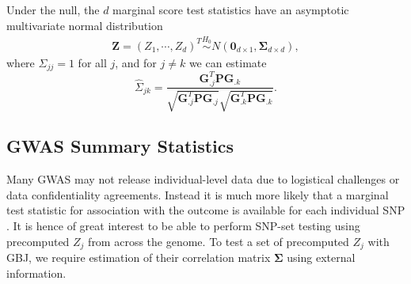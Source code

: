 \documentclass[12pt]{article}
\begin{document}
Under the null, the $d$ marginal score test statistics have an asymptotic multivariate normal distribution
\begin{eqnarray*}
\mathbf{Z}=\left( Z_{1},\cdots, Z_{d} \right)^{T} \overset{H_{0}}{\sim} N(\mathbf{0}_{d\times1},\boldsymbol{\Sigma}_{d\times d}),
\label{p2_eq:Z_dist}
\end{eqnarray*}
where $\Sigma_{jj}=1$ for all $j$, and for $j\neq k$ we can estimate
\begin{equation}
\widehat\Sigma_{jk}=\frac{\mathbf{G}_{.j}^{T}\mathbf{P}\mathbf{G}_{.k}}{\sqrt{\mathbf{G}_{.j}^{T}\mathbf{P}\mathbf{G}_{.j}}\sqrt{\mathbf{G}_{.k}^{T}\mathbf{P}\mathbf{G}_{.k}}}.
\label{p2_eq:estimate_cov}
\end{equation}


\subsection{GWAS Summary Statistics}
\label{p2_ss:summary_stats}

Many GWAS may not release individual-level data due to logistical challenges or data 
confidentiality agreements.
Instead it is much more likely that a marginal test statistic for association with the 
outcome is available for each individual SNP \citep{summary_statistic_review}.
It is hence of great interest to be able to perform SNP-set testing using precomputed
$Z_j$ from across the genome.
To test a set of precomputed $Z_{j}$ with GBJ, we require estimation of their 
correlation matrix $\boldsymbol{\Sigma}$ using external information.
\end{document}
